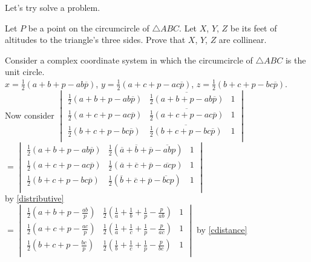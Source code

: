 \documentclass[11pt]{scrartcl}
\begin{document}
Let's try solve a problem.
\begin{example} 
  Let $P$ be a point on the circumcircle of $\triangle ABC$. Let $X$, $Y$, $Z$ be its feet of altitudes to the triangle's three sides. Prove that $X$, $Y$, $Z$ are collinear.\\
\end{example}
\begin{soln}
  Consider a complex coordinate system in which the circumcircle of $\triangle ABC$ is the unit circle.\\
  $x=\frac{1}{2}(a+b+p-ab\overline{p})$, $y=\frac{1}{2}(a+c+p-ac\overline{p})$, $z=\frac{1}{2}(b+c+p-bc\overline{p})$. \\
  Now consider $
  \begin{vmatrix} 
  \frac{1}{2}(a+b+p-ab\overline{p}) & \overline{\frac{1}{2}(a+b+p-ab\overline{p})} & 1 \\
  \frac{1}{2}(a+c+p-ac\overline{p}) & \overline{\frac{1}{2}(a+c+p-ac\overline{p})} & 1 \\
  \frac{1}{2}(b+c+p-bc\overline{p}) & \overline{\frac{1}{2}(b+c+p-bc\overline{p})} & 1 \\
  \end{vmatrix}
  $\\
  $
  =
  \begin{vmatrix} 
  \frac{1}{2}(a+b+p-ab\overline{p}) & \frac{1}{2}(\overline{a}+\overline{b}+\overline{p}-\overline{ab}p) & 1 \\
  \frac{1}{2}(a+c+p-ac\overline{p}) & \frac{1}{2}(\overline{a}+\overline{c}+\overline{p}-\overline{ac}p) & 1 \\
  \frac{1}{2}(b+c+p-bc\overline{p}) & \frac{1}{2}(\overline{b}+\overline{c}+\overline{p}-\overline{bc}p) & 1 \\
  \end{vmatrix}
  $\\ by \ref{distributive} \\
  $
  =
  \begin{vmatrix} 
  \frac{1}{2}(a+b+p-\frac{ab}{p}) & \frac{1}{2}(\frac{1}{a}+\frac{1}{b}+\frac{1}{p}-\frac{p}{ab}) & 1 \\
  \frac{1}{2}(a+c+p-\frac{ac}{p}) & \frac{1}{2}(\frac{1}{a}+\frac{1}{c}+\frac{1}{p}-\frac{p}{ac}) & 1 \\
  \frac{1}{2}(b+c+p-\frac{bc}{p}) & \frac{1}{2}(\frac{1}{b}+\frac{1}{c}+\frac{1}{p}-\frac{p}{bc}) & 1 \\
  \end{vmatrix}
  $ by \ref{cdistance}\\

\end{soln}
\end{document}
